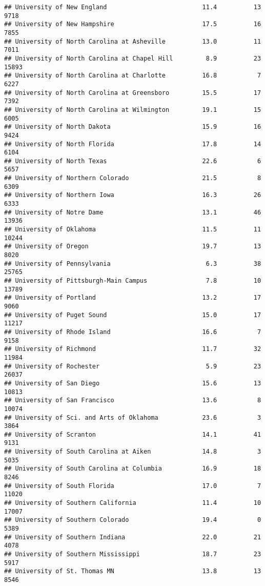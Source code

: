 \documentclass[
]{article}
\begin{document}
\begin{verbatim}
## University of New England                          11.4          13   9718
## University of New Hampshire                        17.5          16   7855
## University of North Carolina at Asheville          13.0          11   7011
## University of North Carolina at Chapel Hill         8.9          23  15893
## University of North Carolina at Charlotte          16.8           7   6227
## University of North Carolina at Greensboro         15.5          17   7392
## University of North Carolina at Wilmington         19.1          15   6005
## University of North Dakota                         15.9          16   9424
## University of North Florida                        17.8          14   6104
## University of North Texas                          22.6           6   5657
## University of Northern Colorado                    21.5           8   6309
## University of Northern Iowa                        16.3          26   6333
## University of Notre Dame                           13.1          46  13936
## University of Oklahoma                             11.5          11  10244
## University of Oregon                               19.7          13   8020
## University of Pennsylvania                          6.3          38  25765
## University of Pittsburgh-Main Campus                7.8          10  13789
## University of Portland                             13.2          17   9060
## University of Puget Sound                          15.0          17  11217
## University of Rhode Island                         16.6           7   9158
## University of Richmond                             11.7          32  11984
## University of Rochester                             5.9          23  26037
## University of San Diego                            15.6          13  10813
## University of San Francisco                        13.6           8  10074
## University of Sci. and Arts of Oklahoma            23.6           3   3864
## University of Scranton                             14.1          41   9131
## University of South Carolina at Aiken              14.8           3   5035
## University of South Carolina at Columbia           16.9          18   8246
## University of South Florida                        17.0           7  11020
## University of Southern California                  11.4          10  17007
## University of Southern Colorado                    19.4           0   5389
## University of Southern Indiana                     22.0          21   4078
## University of Southern Mississippi                 18.7          23   5917
## University of St. Thomas MN                        13.8          13   8546

\end{verbatim}
\end{document}

